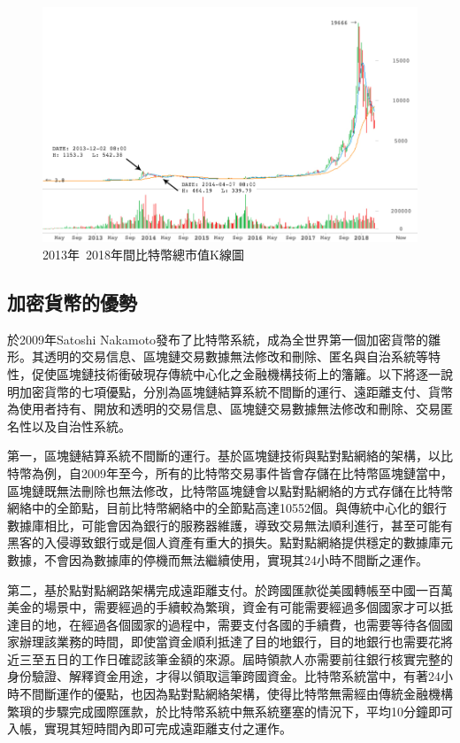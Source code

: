 			\begin{figure}[!htbp]
				\centering
				\includegraphics[width = 1\textwidth]{Thetotalmarketcapitalization.jpg}
				\caption{2013年~2018年間比特幣總市值K線圖\supercite{CryptocurrencyMarketCapitalizations}}\label{Thetotalmarketcapitalization}
			\end{figure}
		

			\subsection{加密貨幣的優勢}
			於2009年Satoshi Nakamoto發布了比特幣系統，成為全世界第一個加密貨幣的雛形。其透明的交易信息、區塊鏈交易數據無法修改和刪除、匿名與⾃治系統等特性，促使區塊鏈技術衝破現存傳統中⼼化之⾦融機構技術上的籓籬。以下將逐一說明加密貨幣的七項優點，分別為區塊鏈結算系統不間斷的運行、遠距離支付、貨幣為使用者持有、開放和透明的交易信息、區塊鏈交易數據無法修改和刪除、交易匿名性以及自治性系統。

				第一，區塊鏈結算系統不間斷的運行。基於區塊鏈技術與點對點網絡的架構，以比特幣為例，自2009年至今，所有的比特幣交易事件皆會存儲在比特幣區塊鏈當中，區塊鏈既無法刪除也無法修改，比特幣區塊鏈會以點對點網絡的方式存儲在比特幣網絡中的全節點\supercite{YouReallyShouldRunaBitcoinFullNode:HeresWhy}，目前比特幣網絡中的全節點高達10552個。與傳統中心化的銀行數據庫相比，可能會因為銀行的服務器維護，導致交易無法順利進行，甚至可能有黑客的入侵導致銀行或是個人資產有重大的損失。點對點網絡提供穩定的數據庫元數據，不會因為數據庫的停機而無法繼續使用，實現其24小時不間斷之運作。
				
				第二，基於點對點網路架構完成遠距離支付。於跨國匯款從美國轉帳至中國一百萬美金的場景中，需要經過的手續較為繁瑣，資金有可能需要經過多個國家才可以抵達目的地，在經過各個國家的過程中，需要支付各國的手續費，也需要等待各個國家辦理該業務的時間，即使當資金順利抵達了目的地銀行，目的地銀行也需要花將近三至五日的工作日確認該筆金額的來源。屆時領款人亦需要前往銀行核實完整的身份驗證、解釋資金用途，才得以領取這筆跨國資金。比特幣系統當中，有著24小時不間斷運作的優點，也因為點對點網絡架構，使得比特幣無需經由傳統金融機構繁瑣的步驟完成國際匯款，於比特幣系統中無系統壅塞的情況下，平均10分鐘即可入帳，實現其短時間內即可完成遠距離支付之運作。

